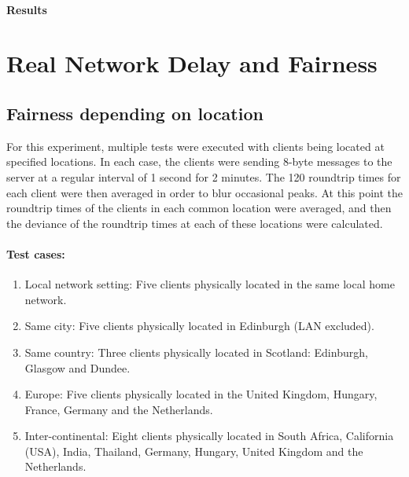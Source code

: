 \documentclass[12pt]{article}
\begin{document}
\paragraph{Results}

\section{Real Network Delay and Fairness}

\subsection{Fairness depending on location}
For this experiment, multiple tests were executed with clients being located at specified locations. In each case, the clients were sending 8-byte messages to the server at a regular interval of 1 second for 2 minutes. The 120 roundtrip times for each client were then averaged in order to blur occasional peaks. At this point the roundtrip times of the clients in each common location were averaged, and then the deviance of the roundtrip times at each of these locations were calculated.

\paragraph{Test cases:}
\begin{enumerate}
\item Local network setting: Five clients physically located in the same local home network.

\item Same city: Five clients physically located in Edinburgh (LAN excluded).

\item Same country: Three clients physically located in Scotland: Edinburgh, Glasgow and Dundee.

\item Europe: Five clients physically located in the United Kingdom, Hungary, France, Germany and the Netherlands.

\item Inter-continental: Eight clients physically located in South Africa, California (USA), India, Thailand, Germany, Hungary, United Kingdom and the Netherlands.

\end{enumerate}
\end{document}
